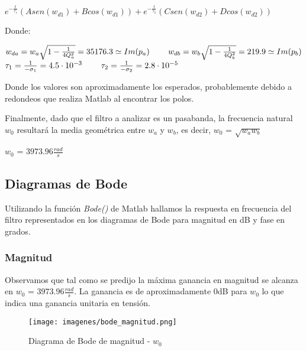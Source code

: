 \documentclass[12pt, titlepage]{article}
\begin{document}
    \begin{center}
        $e^{-\frac{t}{\tau_{1}}}(Asen(w_{d1}) + Bcos(w_{d1}))+e^{-\frac{t}{\tau_{2}}}(Csen(w_{d2}) + Dcos(w_{d2})) $
    \end{center}
    
    Donde:
    
    \begin{center}
        $w_{da} = w_a\sqrt{1-\frac{1}{4Q_a^2}} = 35176.3 \simeq Im(p_a) \hspace{8mm} w_{db} = w_b\sqrt{1-\frac{1}{4Q_b^2}} = 219.9 \simeq Im(p_b)$\\
        \vspace{3mm}
        $\tau_1 = \frac{1}{-\sigma_1} = 4.5\cdot 10^{-3} \hspace{8mm} \tau_2 = \frac{1}{-\sigma_2} = 2.8\cdot 10^{-5} $
    \end{center}
    
    Donde los valores son aproximadamente los esperados, probablemente debido a redondeos que realiza Matlab al encontrar los polos. 
    
    Finalmente, dado que el filtro a analizar es un pasabanda, la frecuencia natural $w_0$ resultará la media geométrica entre $w_a$ y $w_b$, es decir, $w_0$ = $\sqrt{ w_a w_b}$
    \begin{center}
    $w_0$ =  $3973.96\frac{rad}{s}$\\
    \end{center}
    
    
    \newpage
    
    \subsection{Diagramas de Bode}
    Utilizando la función \emph{Bode()} de Matlab hallamos la respuesta en frecuencia del filtro representados en los diagramas de Bode para magnitud en dB y fase en grados.
    \subsubsection{Magnitud}
    Observamos que tal como se predijo la máxima ganancia en magnitud se alcanza en $w_0$ = $3973.96\frac{rad}{s}$. La ganancia es de aproximadamente 0dB para $w_0$ lo que indica una ganancia unitaria en tensión. 
    
    \begin{figure}[!htb]
     \texttt{[image: imagenes/bode\_magnitud.png]}
     \centering
     \caption{Diagrama de Bode de magnitud - $w_0$}
    \end{figure}
    
\end{document}
